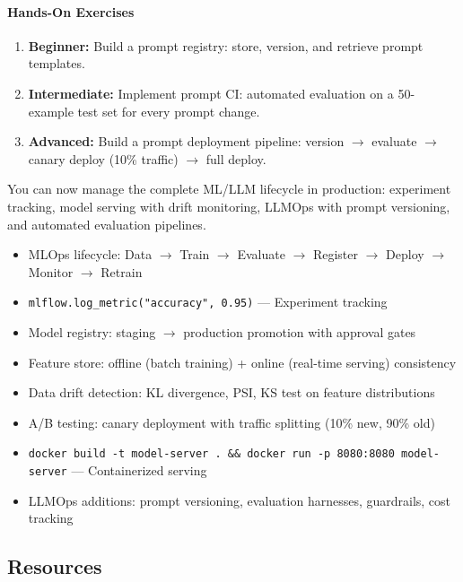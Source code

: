 \documentclass[11pt, a4paper, oneside]{report}
\newcommand{\arrow}{$\rightarrow$}
\begin{document}
\paragraph{Hands-On Exercises}
\begin{enumerate}[leftmargin=*]
\item \textbf{Beginner:} Build a prompt registry: store, version, and retrieve prompt templates.
\item \textbf{Intermediate:} Implement prompt CI: automated evaluation on a 50-example test set for every prompt change.
\item \textbf{Advanced:} Build a prompt deployment pipeline: version \arrow{} evaluate \arrow{} canary deploy (10\% traffic) \arrow{} full deploy.
\end{enumerate}

\begin{microcheckpoint}
You can now manage the complete ML/LLM lifecycle in production: experiment tracking, model serving with drift monitoring, LLMOps with prompt versioning, and automated evaluation pipelines.
\end{microcheckpoint}

\begin{cheatsheetbox}
\begin{itemize}[leftmargin=*]
\item MLOps lifecycle: Data $\to$ Train $\to$ Evaluate $\to$ Register $\to$ Deploy $\to$ Monitor $\to$ Retrain
\item \texttt{mlflow.log\_metric("accuracy", 0.95)} --- Experiment tracking
\item Model registry: staging $\to$ production promotion with approval gates
\item Feature store: offline (batch training) + online (real-time serving) consistency
\item Data drift detection: KL divergence, PSI, KS test on feature distributions
\item A/B testing: canary deployment with traffic splitting (10\% new, 90\% old)
\item \texttt{docker build -t model-server . \&\& docker run -p 8080:8080 model-server} --- Containerized serving
\item LLMOps additions: prompt versioning, evaluation harnesses, guardrails, cost tracking
\end{itemize}
\end{cheatsheetbox}

\subsection*{Resources}
\end{document}
